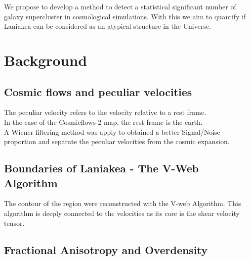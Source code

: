 \documentclass[12pt]{article}
\begin{document}
We propose to develop a method to detect a
 statistical significant number of galaxy
supercluster in cosmological simulations. 
With this we aim to quantify if Laniakea can be
 considered as an atypical structure in
the Universe. 
\\

\section{Background}
\subsection{Cosmic flows and peculiar velocities}


The peculiar velocity refers to the velocity relative to a rest frame. \\

In the case of the Cosmicflows-2 map, the rest frame is the earth. \\




A Wiener filtering method was apply to obtained a better Signal/Noise proportion and separate the peculiar velocities from the cosmic expansion.\\





\subsection{Boundaries of Laniakea - The V-Web Algorithm}
\label{sec:v_web}
The contour of the region were reconstructed with
 the V-web Algorithm. 
This algorithm is deeply
  connected to the velocities as its core is the
   shear velocity tensor.\\






\subsection{Fractional Anisotropy and Overdensity}
\label{sec:FA_trace}
\end{document}
